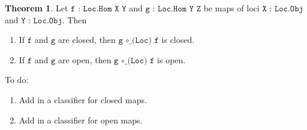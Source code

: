 \documentclass{book}
\theoremstyle{definition}
\newtheorem{theorem}{Theorem}
\begin{document}
\begin{theorem}
Let $\texttt{f : Loc.Hom X Y}$ and $\texttt{g : Loc.Hom Y Z}$ be maps of loci $\texttt{X : Loc.Obj}$ and $\texttt{Y : Loc.Obj}$. Then
\begin{enumerate}
\item If $\texttt{f}$ and $\texttt{g}$ are closed, then $\texttt{g ∘\_(Loc) f}$ is closed.
\item If $\texttt{f}$ and $\texttt{g}$ are open, then $\texttt{g ∘\_(Loc) f}$ is open.
\end{enumerate} 
\end{theorem}


To do:
\begin{enumerate}
\item Add in a classifier for closed maps.
\item Add in a classifier for open maps.
\end{enumerate}

\end{document}
